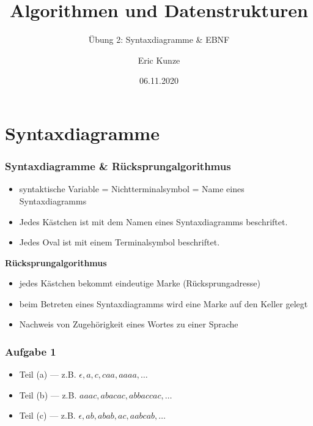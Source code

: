 \documentclass{beamer}
\begin{document}
	
	\title{Algorithmen und Datenstrukturen}
	\subtitle{Übung 2: Syntaxdiagramme \& EBNF}
	\author{Eric Kunze}
	\date{06.11.2020}

	\maketitle



\section{Syntaxdiagramme}

\begin{frame} \frametitle{Syntaxdiagramme \& Rücksprungalgorithmus}
	\small
	\begin{itemize}
		\item syntaktische Variable = Nichtterminalsymbol = Name eines Syntaxdiagramms
		\item Jedes Kästchen ist mit dem Namen eines Syntaxdiagramms beschriftet.
		\item Jedes Oval ist mit einem Terminalsymbol beschriftet.
	\end{itemize}

	\pause

	\textbf{Rücksprungalgorithmus}
	\begin{itemize}
		\item jedes Kästchen bekommt eindeutige Marke (Rücksprungadresse)
		\item beim Betreten eines Syntaxdiagramms wird eine Marke auf den Keller gelegt
		\item Nachweis von Zugehörigkeit eines Wortes zu einer Sprache
	\end{itemize}
\end{frame}

\begin{frame} \frametitle{Aufgabe 1}
	\begin{itemize}
		\item Teil (a) ---
		z.B. $\epsilon, a, c, caa, aaaa, \dots$
		\item Teil (b) ---
		z.B. $aaac, abacac, abbaccac, \dots$
		\item 	Teil (c) ---
		z.B. $\epsilon, ab, abab, ac, aabcab, \dots$
	\end{itemize}
\end{frame}
\end{document}
